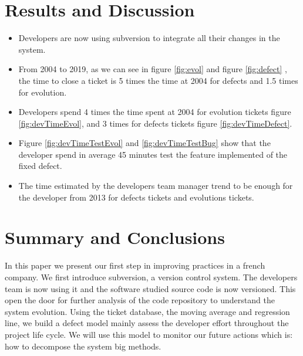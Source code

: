 \documentclass[10pt,conference]{IEEEtran}
\begin{document}
\section{Results and Discussion}
\label{sec:results-discussion}

\begin{itemize}
    \item Developers are now using subversion to integrate all their changes in the system. 
    \item From 2004 to 2019, as we can see in figure \ref{fig:evol} and figure \ref{fig:defect} ,  the time to close a ticket is 5 times the time at 2004 for defects and 1.5 times for evolution.
    \item Developers spend 4 times the time spent at 2004 for evolution tickets figure \ref{fig:devTimeEvol}, and  3 times for defects tickets figure \ref{fig:devTimeDefect}.
    \item  Figure \ref{fig:devTimeTestEvol} and \ref{fig:devTimeTestBug} show that the developer spend in average 45 minutes test  the feature implemented of the fixed defect.
    \item The time estimated by the developers team manager trend to be enough for the developer from 2013 for defects tickets and evolutions tickets.
\end{itemize}

\section{Summary and Conclusions}
\label{sec:conclusion}

In this paper we present our first step in  improving practices in a french company. We first introduce subversion, a version control system.
The developers team is now using it and the software studied source code is now versioned.
This open the door for further analysis of the code repository to understand the system evolution. 
Using the ticket database, the moving average and regression line, we build a defect model mainly assess the developer effort throughout the project life cycle. We will use this model to monitor our future actions which is: how to decompose the system big methods.

%


\vspace{12pt}
\end{document}

